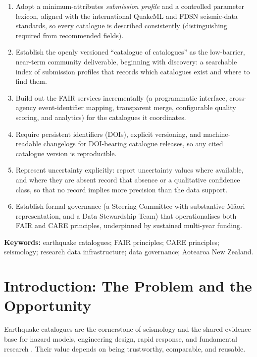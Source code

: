 \documentclass[11pt]{article}
\begin{document}
\bigskip
{}
\begin{enumerate}
\setlength{\itemsep}{1pt}
\item Adopt a minimum-attributes \emph{submission profile} and a controlled parameter lexicon, aligned with the international QuakeML and FDSN seismic-data standards, so every catalogue is described consistently (distinguishing required from recommended fields).
\item Establish the openly versioned ``catalogue of catalogues'' as the low-barrier, near-term community deliverable, beginning with discovery: a searchable index of submission profiles that records which catalogues exist and where to find them.
\item Build out the FAIR services incrementally (a programmatic interface, cross-agency event-identifier mapping, transparent merge, configurable quality scoring, and analytics) for the catalogues it coordinates.
\item Require persistent identifiers (DOIs), explicit versioning, and machine-readable changelogs for DOI-bearing catalogue releases, so any cited catalogue version is reproducible.
\item Represent uncertainty explicitly: report uncertainty values where available, and where they are absent record that absence or a qualitative confidence class, so that no record implies more precision than the data support.
\item Establish formal governance (a Steering Committee with substantive M\=aori representation, and a Data Stewardship Team) that operationalises both FAIR and CARE principles, underpinned by sustained multi-year funding.
\end{enumerate}

\smallskip
\noindent\textbf{Keywords:} earthquake catalogues; FAIR principles; CARE principles; seismology; research data infrastructure; data governance; Aotearoa New Zealand.

\clearpage


\tableofcontents
\pagebreak

\section{Introduction: The Problem and the Opportunity}
Earthquake catalogues are the cornerstone of seismology and the shared evidence base for hazard models, engineering design, rapid response, and fundamental research \citep{woessner2010instrumental}. Their value depends on being trustworthy, comparable, and reusable.
\end{document}
